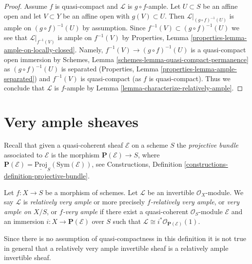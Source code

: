 \begin{proof}
Assume $f$ is quasi-compact and $\mathcal{L}$ is $g \circ f$-ample.
Let $U \subset S$ be an affine open and let $V \subset Y$ be
an affine open with $g(V) \subset U$.
Then $\mathcal{L}|_{(g \circ f)^{-1}(U)}$ is ample on
$(g \circ f)^{-1}(U)$ by assumption.
Since $f^{-1}(V) \subset (g \circ f)^{-1}(U)$ we see that
$\mathcal{L}|_{f^{-1}(V)}$ is ample on $f^{-1}(V)$ by
Properties, Lemma \ref{properties-lemma-ample-on-locally-closed}.
Namely, $f^{-1}(V) \to (g \circ f)^{-1}(U)$ is a quasi-compact
open immersion by
Schemes, Lemma \ref{schemes-lemma-quasi-compact-permanence}
as $(g \circ f)^{-1}(U)$ is separated
(Properties, Lemma \ref{properties-lemma-ample-separated})
and $f^{-1}(V)$ is quasi-compact (as $f$ is quasi-compact).
Thus we conclude that $\mathcal{L}$ is $f$-ample by
Lemma \ref{lemma-characterize-relatively-ample}.
\end{proof}







\section{Very ample sheaves}
\label{section-very-ample}

\noindent
Recall that given a quasi-coherent sheaf $\mathcal{E}$ on a scheme
$S$ the {\it projective bundle} associated to $\mathcal{E}$ is the morphism
$\mathbf{P}(\mathcal{E}) \to S$, where
$\mathbf{P}(\mathcal{E}) = \underline{\text{Proj}}_S(\text{Sym}(\mathcal{E}))$,
see
Constructions, Definition \ref{constructions-definition-projective-bundle}.

\begin{definition}
\label{definition-very-ample}
Let $f : X \to S$ be a morphism of schemes.
Let $\mathcal{L}$ be an invertible $\mathcal{O}_X$-module.
We say $\mathcal{L}$ is {\it relatively very ample} or more
precisely {\it $f$-relatively very ample}, or
{\it very ample on $X/S$}, or {\it $f$-very ample} if
there exist a quasi-coherent $\mathcal{O}_S$-module
$\mathcal{E}$ and an immersion $i : X \to \mathbf{P}(\mathcal{E})$
over $S$ such that
$\mathcal{L} \cong i^*\mathcal{O}_{\mathbf{P}(\mathcal{E})}(1)$.
\end{definition}



\noindent
Since there is no assumption of quasi-compactness in this definition it is not
true in general that a relatively very ample invertible sheaf is a relatively
ample invertible sheaf.

